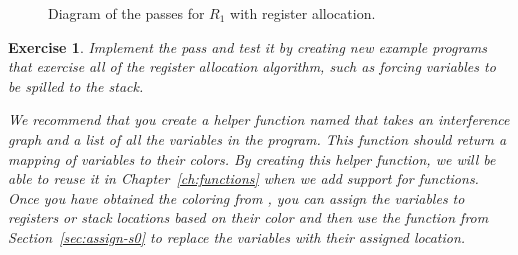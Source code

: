\documentclass[11pt]{book}
\newtheorem{exercise}[theorem]{Exercise}
\begin{document}
\begin{figure}[p]
\caption{Diagram of the passes for $R_1$ with register allocation.}
\label{fig:reg-alloc-passes}
\end{figure}

\begin{exercise}\normalfont
Implement the pass  and test it by creating
new example programs that exercise all of the register allocation
algorithm, such as forcing variables to be spilled to the stack.

We recommend that you create a helper function named
 that takes an interference graph and a list of all
the variables in the program. This function should return a mapping of
variables to their colors. By creating this helper function, we will
be able to reuse it in Chapter~\ref{ch:functions} when we add support
for functions.  Once you have obtained the coloring from
, you can assign the variables to registers or stack
locations based on their color and then use the 
function from Section~\ref{sec:assign-s0} to replace the variables
with their assigned location.
\end{exercise}
\end{document}
